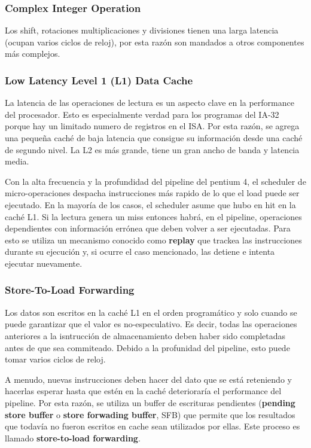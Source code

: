 \subsubsection*{Complex Integer Operation}
Los shift, rotaciones multiplicaciones y divisiones tienen una larga latencia (ocupan varios ciclos de reloj), por esta razón son mandados a otros componentes más complejos. 

\subsubsection*{Low Latency Level 1 (L1) Data Cache}
La latencia de las operaciones de lectura es un aspecto clave en la performance del procesador. Esto es especialmente verdad para los programas del IA-32 porque hay un limitado numero de registros en el ISA. Por esta razón, se agrega una pequeña caché de baja latencia que consigue su información desde una caché de segundo nivel. La L2 es más grande, tiene un gran ancho de banda y latencia media.

Con la alta frecuencia y la profundidad del pipeline del pentium 4, el scheduler de micro-operaciones despacha instrucciones más rapido de lo que el load puede ser ejecutado. En la mayoría de los casos, el scheduler asume que hubo en hit en la caché L1. Si la lectura genera un miss entonces habrá, en el pipeline, operaciones dependientes con información errónea que deben volver a ser ejecutadas. Para esto se utiliza un mecanismo conocido como \textbf{replay} que trackea las instrucciones durante su ejecución y, si ocurre el caso mencionado, las detiene e intenta ejecutar nuevamente. 

\subsubsection*{Store-To-Load Forwarding}\label{sec::Intel::NetBurst::FrontEnd::Forwarding}
Los datos son escritos en la caché L1 en el orden programático y solo cuando se puede garantizar que el valor es no-especulativo. Es decir, todas las operaciones anteriores a la isntrucción de almacenamiento deben haber sido completadas antes de que sea commiteado. Debido a la profunidad del pipeline, esto puede tomar varios ciclos de reloj.

A menudo, nuevas instrucciones deben hacer del dato que se está reteniendo y hacerlas esperar hasta que estén en la caché deterioraría el performance del pipeline. Por esta razón, se utiliza un buffer de escrituras pendientes (\textbf{pending store buffer} o \textbf{store forwading buffer}, SFB) que permite que los resultados que todavía no fueron escritos en cache sean utilizados por ellas. Este proceso es llamado \textbf{store-to-load forwarding}.

